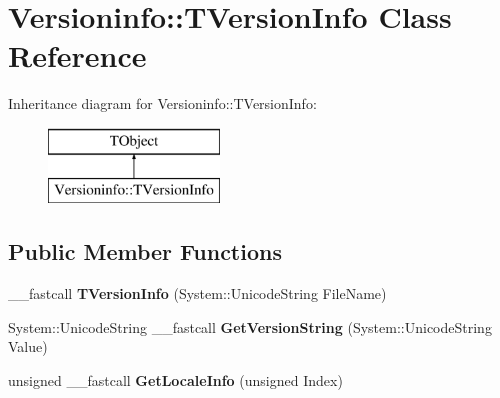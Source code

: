 \hypertarget{class_versioninfo_1_1_t_version_info}{\section{Versioninfo\+:\+:T\+Version\+Info Class Reference}
\label{class_versioninfo_1_1_t_version_info}
}
Inheritance diagram for Versioninfo\+:\+:T\+Version\+Info\+:\begin{figure}[H]
\begin{center}
\leavevmode
\includegraphics[height=2.000000cm]{class_versioninfo_1_1_t_version_info}
\end{center}
\end{figure}
\subsection*{Public Member Functions}
\begin{DoxyCompactItemize}
\item 
\hypertarget{class_versioninfo_1_1_t_version_info_a95ed65fbae48f0ac71dabd03855fe5d7}{\+\_\+\+\_\+fastcall {\bfseries T\+Version\+Info} (System\+::\+Unicode\+String File\+Name)}\label{class_versioninfo_1_1_t_version_info_a95ed65fbae48f0ac71dabd03855fe5d7}

\item 
\hypertarget{class_versioninfo_1_1_t_version_info_af4df2ca719ff78641f96221c9ee473d0}{System\+::\+Unicode\+String \+\_\+\+\_\+fastcall {\bfseries Get\+Version\+String} (System\+::\+Unicode\+String Value)}\label{class_versioninfo_1_1_t_version_info_af4df2ca719ff78641f96221c9ee473d0}

\item 
\hypertarget{class_versioninfo_1_1_t_version_info_abb6878e089b878ad810fa98ceddd4ff8}{unsigned \+\_\+\+\_\+fastcall {\bfseries Get\+Locale\+Info} (unsigned Index)}\label{class_versioninfo_1_1_t_version_info_abb6878e089b878ad810fa98ceddd4ff8}

\end{DoxyCompactItemize}
